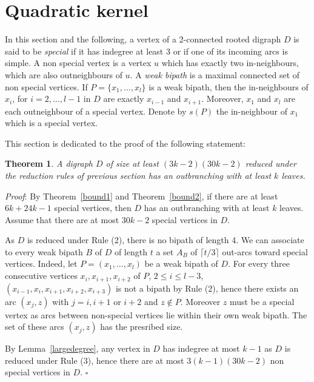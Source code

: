 \documentclass{article}
\newtheorem{theorem}{Theorem}
\begin{document}
\section{Quadratic kernel}\label{skernel}

In this section and the following, a vertex of a 2-connected rooted digraph $D$ is said to be \emph{special} if it has indegree at least 3 or if one of its incoming arcs is simple. A non special vertex is a vertex $u$ which has exactly two in-neighbours, which are also outneighbours of $u$. A \emph{weak bipath} is a maximal connected set of non special vertices. If $P=\{x_1,\dots,x_l\}$ is a weak bipath, then the in-neighbours of $x_i$, for $i=2,\dots,l-1$ in $D$ are exactly $x_{i-1}$ and $x_{i+1}$. Moreover, $x_1$ and $x_l$ are each outneighbour of a special vertex. Denote by $s(P)$ the in-neighbour of $x_1$ which is a special vertex.



This section is dedicated to the proof of the following statement:

\begin{theorem}\label{kernel}
A digraph $D$ of size at least $(3k-2)(30k-2)$ reduced under the reduction rules of previous section has an outbranching with at least $k$ leaves.
\end{theorem}

\emph{Proof}:
By Theorem~\ref{bound1} and Theorem~\ref{bound2}, if there are at least $6k+24k-1$ special vertices, then $D$ has an outbranching with at least $k$ leaves. Assume that there are at most $30k-2$ special vertices in $D$. 

As $D$ is reduced under Rule (2), there is no bipath of length 4. We can associate to every weak bipath $B$ of $D$ of length $t$ a set $A_B$ of $\lceil{t/3}\rceil$ out-arcs toward special vertices. Indeed,  let $P=(x_1,\dots, x_l)$ be a weak bipath of $D$. For every three consecutive vertices $x_i,x_{i+1},x_{i+2}$ of $P$, $2\le i \le l-3$, $(x_{i-1},x_i,x_{i+1},x_{i+2},x_{i+3})$ is not a bipath by Rule (2), hence there exists an arc $(x_j,z)$ with $j=i,i+1$ or $i+2$ and $z\notin P$. Moreover $z$ must be a special vertex as arcs between non-special vertices lie within their own weak bipath. The set of these arcs $(x_j,z)$ has the presribed size.

By Lemma~\ref{largedegree}, any vertex in $D$ has indegree at most $k-1$ as $D$ is reduced under Rule (3), hence there are at most $3(k-1)(30k-2)$ non special vertices in $D$.
$\square$


\vspace{12pt}
\end{document}
